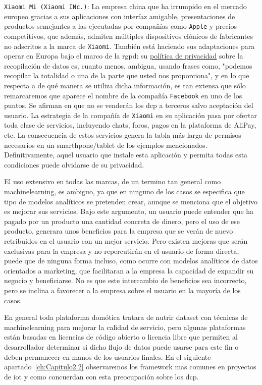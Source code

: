 \verb|Xiaomi Mi (Xiaomi INc.)|: La empresa china que ha irrumpido en el mercado europeo gracias a sus aplicaciones con interfaz amigable, presentaciones de productos semejantes a las ejecutadas por compañías como \verb|Apple| y precios competitivos, que además, admiten múltiples dispositivos clónicos de fabricantes no adscritos a la marca de \verb|Xiaomi|. También está haciendo sus adaptaciones para operar en Europa bajo el marco de la \gls{rgpd}: su \href{https://www.mi.com/es/about/privacy}{política de privacidad} sobre la recopilación de datos es, cuanto menos, ambigua, usando frases como, "podemos recopilar la totalidad o una de la parte que usted nos proporciona", y en lo que respecta a de qué manera se utiliza dicha información, es tan extensa que sólo remarcaremos que aparece el nombre de la compañía \verb|Facebook| en uno de los puntos. Se afirman en que no se venderán los \gls{dcp} a terceros salvo aceptación del usuario. La estrategia de la compañía de \verb|Xiaomi| en su aplicación pasa por ofertar toda clase de servicios, incluyendo chats, foros, pagos en la plataforma de AliPay, etc. La consecuencia de estos servicios genera la tabla más larga de permisos necesarios en un smarthpone/tablet de los ejemplos mencionados. Definitivamente, aquel usuario que instale esta aplicación y permita todas esta condiciones puede olvidarse de su privacidad.


\vspace{1cm}

El uso extensivo en todas las marcas, de un termino tan general como \gls{machinelearning}, es ambiguo, ya que en ninguno de los casos se especifica que tipo de modelos analíticos se pretenden crear, aunque se menciona que el objetivo es mejorar sus servicios. Bajo este argumento, un usuario puede entender que ha pagado por un producto una cantidad concreta de dinero, pero el uso de ese producto, generara unos beneficios para la empresa que se verán de nuevo retribuidos en el usuario con un mejor servicio. Pero existen mejoras que serán exclusivas para la empresa y no repercutirán en el usuario de forma directa, puede que de ninguna forma incluso, como ocurre con modelos analíticos de datos orientados a marketing, que facilitaran  a la empresa la capacidad de expandir su negocio y beneficiarse. No es que este intercambio de beneficios sea incorrecto, pero se inclina a favorecer a la empresa sobre el usuario en la mayoría de los casos.

\vspace{1cm}

En general toda plataforma domótica tratara de nutrir \gls{dataset} con técnicas de \gls{machinelearning} para mejorar la calidad de servicio, pero algunas plataformas están basadas en licencias de código abierto o licencia libre que permiten al desarrollador determinar si dicho flujo de datos puede usarse para este fin o deben permanecer en manos de los usuarios finales. En el siguiente apartado~\ref{ch:Capitulo2.2} observaremos los \gls{framework} mas comunes en proyectos de \gls{iot} y como concuerdan con esta preocupación sobre los \gls{dcp}.


